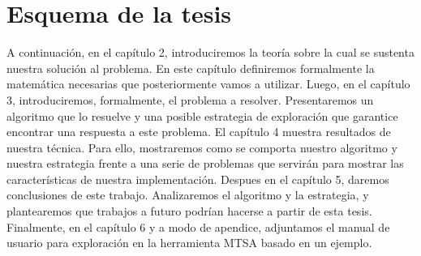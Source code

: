 \section{Esquema de la tesis}

A continuación, en el capítulo 2, introduciremos la teoría sobre la cual se 
sustenta nuestra 
solución al problema. 
En este capítulo definiremos formalmente la matemática necesarias que 
posteriormente vamos a utilizar. Luego, en el capítulo 3, introduciremos, 
formalmente, el problema a resolver. Presentaremos un algoritmo que lo resuelve 
y una posible estrategia de exploración que garantice encontrar una respuesta a 
este problema. El capítulo 4 muestra resultados de nuestra técnica.
Para ello, mostraremos como se comporta nuestro algoritmo y nuestra estrategia 
frente a una serie de problemas que servirán para mostrar las características 
de nuestra implementación. Despues en el capítulo 5, daremos conclusiones de 
este trabajo. Analizaremos el algoritmo y la estrategia, y plantearemos que 
trabajos a futuro podrían hacerse a partir de esta tesis. 
Finalmente, en el capítulo 6 y a modo de apendice, adjuntamos el manual de 
usuario para exploración en la herramienta MTSA basado en un ejemplo.
